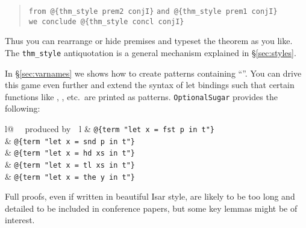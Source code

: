 \begin{isabellebody}
\begin{isamarkuptext}
\begin{quote}
\verb!from !\verb!@!\verb!{thm_style prem2 conjI}! \verb!and !\verb!@!\verb!{thm_style prem1 conjI}!\\
\verb!we conclude !\verb!@!\verb!{thm_style concl conjI}!
\end{quote}
Thus you can rearrange or hide premises and typeset the theorem as you like.
The \verb!thm_style! antiquotation is a general mechanism explained
in \S\ref{sec:styles}.%
\end{isamarkuptext}%
\isamarkuptrue%
%
\isamarkuptrue%
%
\begin{isamarkuptext}%
In \S\ref{sec:varnames} we shows how to create patterns containing
  ``\isa{\_}''.
  You can drive this game even further and extend the syntax of let
  bindings such that certain functions like , , 
  etc.\ are printed as patterns. \texttt{OptionalSugar} provides the
  following:
  
  \begin{center}
  \begin{tabular}{l@ {~~produced by~~}l}
   & \verb!@!\verb!{term "let x = fst p in t"}!\\
   & \verb!@!\verb!{term "let x = snd p in t"}!\\
   & \verb!@!\verb!{term "let x = hd xs in t"}!\\
   & \verb!@!\verb!{term "let x = tl xs in t"}!\\
   & \verb!@!\verb!{term "let x = the y in t"}!\\
  \end{tabular}
  \end{center}%
\end{isamarkuptext}%
\isamarkuptrue%
%
\isamarkuptrue%
%
\begin{isamarkuptext}%
Full proofs, even if written in beautiful Isar style, are likely to
  be too long and detailed to be included in conference papers, but
  some key lemmas might be of interest.


\end{isamarkuptext}
\end{isabellebody}

